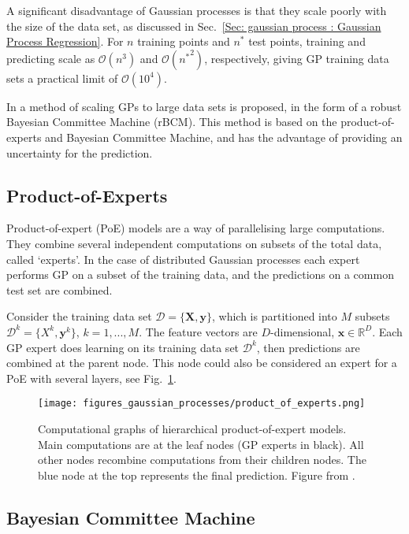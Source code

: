 \documentclass[twoside,english]{uiofysmaster}
\begin{document}
{A significant disadvantage of Gaussian processes is that they scale poorly with the size of the data set, as discussed in Sec.~\ref{Sec: gaussian process : Gaussian Process Regression}. For $n$ training points and $n^*$ test points, training and predicting scale as $\mathcal{O}(n^3)$ and $\mathcal{O}({n^*}^2)$, respectively, giving GP training data sets a practical limit of $\mathcal{O}(10^4)$.

In \cite{deisenroth2015distributed} a method of scaling GPs to large data sets is proposed, in the form of a robust Bayesian Committee Machine (rBCM). This method is based on the product-of-experts and Bayesian Committee Machine, and has the advantage of providing an uncertainty for the prediction.


\subsection{Product-of-Experts}

Product-of-expert (PoE) models are a way of parallelising large computations. They combine several independent computations on subsets of the total data, called `experts'. In the case of distributed Gaussian processes each expert performs GP on a subset of the training data, and the predictions on a common test set are combined. 

Consider the training data set $\mathcal{D} = \{ \textbf{X}, \textbf{y}\}$, which is partitioned into $M$ subsets $\mathcal{D}^k = \{X^k, \textbf{y}^k \}$, $k = 1,...,M$. The feature vectors are $D$-dimensional, $\textbf{x} \in \mathbb{R}^D$. Each GP expert does learning on its training data set $\mathcal{D}^k$, then predictions are combined at the parent node. This node could also be considered an expert for a PoE with several layers, see Fig.~\ref{Fig:: gaussian process : DGP illustration of layers}. 

\begin{figure}
\texttt{[image: figures\_gaussian\_processes/product\_of\_experts.png]}
\caption{Computational graphs of hierarchical product-of-expert models. Main computations are at the leaf nodes (GP experts in black). All other nodes recombine computations from their children nodes. The blue node at the top represents the final prediction. Figure from \cite{deisenroth2015distributed}.}
\label{Fig:: gaussian process : DGP illustration of layers}
\end{figure}

\subsection{Bayesian Committee Machine}

}
\end{document}
